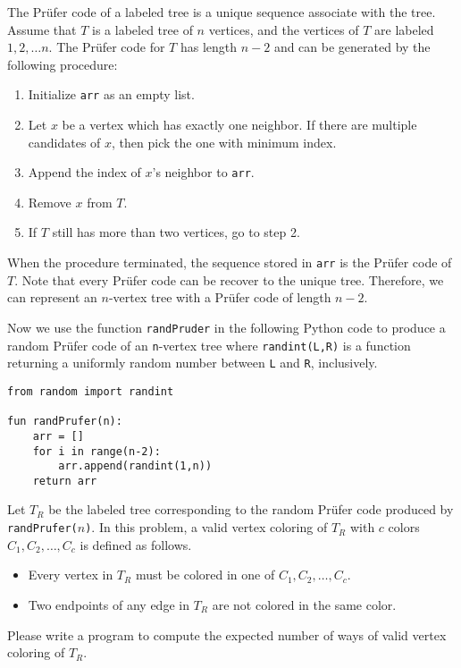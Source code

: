 The Prüfer code of a labeled tree is a unique sequence associate with the tree.
Assume that $T$ is a labeled tree of $n$ vertices, and the vertices of $T$ 
are labeled $1,2,\ldots n$.
The Prüfer code for $T$ has length $n-2$ and 
can be generated by the following procedure:
\begin{enumerate}
\tightlist
\item Initialize \verb+arr+ as an empty list.
\item Let $x$ be a vertex which has exactly one neighbor. 
      If there are multiple candidates of $x$, 
      then pick the one with minimum index.
\item Append the index of $x$'s neighbor to \verb+arr+.
\item Remove $x$ from $T$.
\item If $T$ still has more than two vertices, go to step 2.
\end{enumerate}
When the procedure terminated, the sequence stored in \verb+arr+ 
is the Prüfer code of $T$. 
Note that every Prüfer code can be recover to the unique tree.
Therefore, we can represent an $n$-vertex tree with a Prüfer code of length
$n-2$.

Now we use the function \verb+randPruder+ in the following Python code 
to produce a random Prüfer code of an \verb+n+-vertex tree 
where \verb+randint(L,R)+ is a function returning a uniformly random 
number between \verb+L+ and \verb+R+, inclusively.

\begin{verbatim}
from random import randint

fun randPrufer(n):
    arr = []
    for i in range(n-2):
        arr.append(randint(1,n))
    return arr
\end{verbatim}

Let $T_R$ be the labeled tree corresponding to the random Prüfer code 
produced by  \verb+randPrufer(+$n$\verb+)+.
In this problem, a valid vertex coloring of $T_R$ with $c$ colors 
$C_1,C_2,\dots,C_c$ is defined as follows.
\begin{itemize}
\item Every vertex in $T_R$ must be colored in one of $C_1,C_2,\dots,C_c$.
\item Two endpoints of any edge in $T_R$ are not colored in the same color.
\end{itemize}

Please write a program to compute the expected number of ways of valid vertex 
coloring of $T_R$. 
